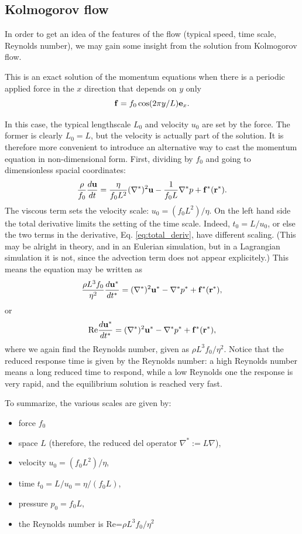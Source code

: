 \subsection{Kolmogorov flow}

In order to get an idea of the features of the flow (typical speed,
time scale, Reynolds number), we may gain some insight from the
solution from Kolmogorov flow.

This is an exact solution of the momentum equations when there is a
periodic applied force in the $x$ direction that depends on $y$ only
\[
\mathbf{f} = f_0 \cos(2\pi y/L) \mathbf{e}_x .
\]

In this case, the typical lengthscale $L_0$ and velocity $u_0$ are set
by the force. The former is clearly $L_0=L$, but the velocity is
actually part of the solution. It is therefore more convenient to
introduce an alternative way to cast the momentum equation in
non-dimensional form. First, dividing by $f_0$ and going to
dimensionless spacial coordinates:
\begin{equation}
\label{eq:Navier-Stokes_nondim1}
\frac{\rho}{f_0}
\frac{d \mathbf{u}}{d t} =
\frac\eta{f_0 L^2} (\nabla^*)^2 \mathbf{u}
-\frac 1{f_0 L} \nabla^* p + \mathbf{f}^*(\mathbf{r}^*) .
\end{equation}
The viscous term sets the velocity scale: $u_0 = ( f_0 L^2 ) / \eta $.
On the left hand side the total derivative limits the setting of the
time scale. Indeed, $t_0=L/u_0$, or else the two terms in the
derivative, Eq. \ref{eq:total_deriv}, have different scaling. (This
may be alright in theory, and in an Eulerian simulation, but in a
Lagrangian simulation it is not, since the advection term does not
appear explicitely.) This means the equation may be written as
\[
\frac{\rho L^3 f_0}{\eta^2}
\frac{d \mathbf{u}^*}{d t^*} =
(\nabla^*)^2 \mathbf{u}^*
-\nabla^* p^* + \mathbf{f}^*(\mathbf{r}^*) ,
\]
or
\begin{equation}
\label{eq:Navier-Stokes_nondim2}
\mathrm{Re}
\frac{d \mathbf{u}^*}{d t^*} =
(\nabla^*)^2 \mathbf{u}^*
-\nabla^* p^* + \mathbf{f}^*(\mathbf{r}^*) ,
\end{equation}
where we again find the Reynolds number, given as $\rho L^3 f_0 /
\eta^2$.  Notice that the reduced response time is given by the
Reynolds number: a high Reynolds number means a long reduced time to
respond, while a low Reynolds one the response is very rapid, and the
equilibrium solution is reached very fast.

To summarize, the various scales are given by:
\begin{itemize}
\item force $f_0$
\item space $L$ (therefore, the reduced del operator $\nabla^* :=
  L \nabla$),
\item velocity $u_0 = ( f_0 L^2 ) / \eta $,
\item time $t_0 = L / u_0 = \eta / (f_0 L) $,
\item pressure $p_0= f_0 L $,
\item the Reynolds number is Re=$\rho L^3 f_0 / \eta^2$
\end{itemize}


